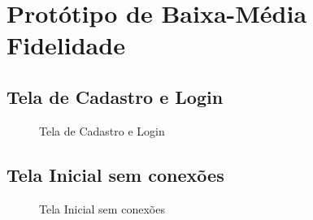 \section{Protótipo de Baixa-Média Fidelidade}
\label{prototipo}
\subsection{Tela de Cadastro e Login}
\begin{figure}[H]
\centering
{}
\caption{Tela de Cadastro e Login}
\end{figure}

\subsection{Tela Inicial sem conexões}
\begin{figure}[H]
\centering
{}
\caption{Tela Inicial sem conexões }
\end{figure}

